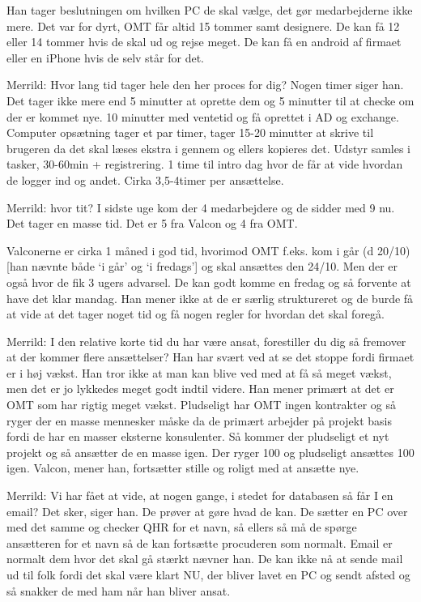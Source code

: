 Han tager beslutningen om hvilken PC de skal vælge, det gør medarbejderne ikke mere. Det var for dyrt, OMT får altid 15 tommer samt designere. De kan få 12 eller 14 tommer hvis de skal ud og rejse meget. 
De kan få en android af firmaet eller en iPhone hvis de selv står for det. 

Merrild: Hvor lang tid tager hele den her proces for dig?
Nogen timer siger han. Det tager ikke mere end 5 minutter at oprette dem og 5 minutter til at checke om der er kommet nye. 10 minutter med ventetid og få oprettet i AD og exchange. Computer opsætning tager et par timer, tager 15-20 minutter at skrive til brugeren da det skal læses ekstra i gennem og ellers kopieres det. Udstyr samles i tasker, 30-60min + registrering. 1 time til intro dag hvor de får at vide hvordan de logger ind og andet. Cirka 3,5-4timer per ansættelse. 

Merrild: hvor tit?
I sidste uge kom der 4 medarbejdere og de sidder med 9 nu. Det tager en masse tid. Det er 5 fra Valcon og 4 fra OMT. 

Valconerne er cirka 1 måned i god tid, hvorimod OMT f.eks. kom i går (d 20/10) [han nævnte både ‘i går’ og ‘i fredags’] og skal ansættes den 24/10. Men der er også hvor de fik 3 ugers advarsel. De kan godt komme en fredag og så forvente at have det klar mandag. Han mener ikke at de er særlig struktureret og de burde få at vide at det tager noget tid og få nogen regler for hvordan det skal foregå.

Merrild: I den relative korte tid du har være ansat, forestiller du dig så fremover at der kommer flere ansættelser?
Han har svært ved at se det stoppe fordi firmaet er i høj vækst. Han tror ikke at man kan blive ved med at få så meget vækst, men det er jo lykkedes meget godt indtil videre. Han mener primært at det er OMT som har rigtig meget vækst. Pludseligt har OMT ingen kontrakter og så ryger der en masse mennesker måske da de primært arbejder på projekt basis fordi de har en masser eksterne konsulenter. Så kommer der pludseligt et nyt projekt og så ansætter de en masse igen. Der ryger 100 og pludseligt ansættes 100 igen. Valcon, mener han, fortsætter stille og roligt med at ansætte nye.

Merrild: Vi har fået at vide, at nogen gange, i stedet for databasen så får I en email?
Det sker, siger han. De prøver at gøre hvad de kan. De sætter en PC over med det samme og checker QHR for et navn, så ellers så må de spørge ansætteren for et navn så de kan fortsætte procuderen som normalt. Email er normalt dem hvor det skal gå stærkt nævner han. De kan ikke nå at sende mail ud til folk fordi det skal være klart NU, der bliver lavet en PC og sendt afsted og så snakker de med ham når han bliver ansat.

